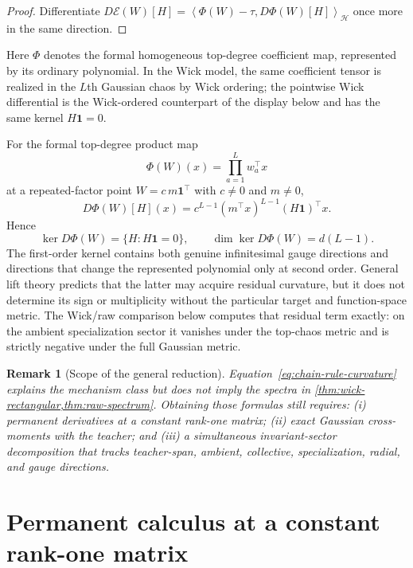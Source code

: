 \documentclass[11pt]{article}
\newtheorem{remark}[theorem]{Remark}
\newcommand{\one}{\mathbf{1}}
\newcommand{\ip}[2]{\left\langle #1,#2\right\rangle}
\begin{document}
\begin{proof}
Differentiate $D\mathcal E(W)[H]=\ip{\Phi(W)-\tau}{D\Phi(W)[H]}_{\mathcal H}$ once more in the same direction.
\end{proof}

Here $\Phi$ denotes the formal homogeneous top-degree coefficient map, represented by its ordinary polynomial.  In the Wick model, the same coefficient tensor is realized in the $L$th Gaussian chaos by Wick ordering; the pointwise Wick differential is the Wick-ordered counterpart of the display below and has the same kernel $H\one=0$.

For the formal top-degree product map
\[
\Phi(W)(x)=\prod_{a=1}^{L}w_a^\top x
\]
at a repeated-factor point $W=c\,m\one^\top$ with $c\ne0$ and $m\ne0$,
\begin{equation}
D\Phi(W)[H](x)
=c^{L-1}(m^\top x)^{L-1}(H\one)^\top x.
\label{eq:product-differential}
\end{equation}
Hence
\begin{equation}
\ker D\Phi(W)=\{H:H\one=0\},
\qquad
\dim\ker D\Phi(W)=d(L-1).
\label{eq:product-kernel}
\end{equation}
The first-order kernel contains both genuine infinitesimal gauge directions and directions that change the represented polynomial only at second order.  General lift theory predicts that the latter may acquire residual curvature, but it does not determine its sign or multiplicity without the particular target and function-space metric.  The Wick/raw comparison below computes that residual term exactly: on the ambient specialization sector it vanishes under the top-chaos metric and is strictly negative under the full Gaussian metric.

\begin{remark}[Scope of the general reduction]
Equation~\eqref{eq:chain-rule-curvature} explains the mechanism class but does not imply the spectra in \cref{thm:wick-rectangular,thm:raw-spectrum}.  Obtaining those formulas still requires: (i) permanent derivatives at a constant rank-one matrix; (ii) exact Gaussian cross-moments with the teacher; and (iii) a simultaneous invariant-sector decomposition that tracks teacher-span, ambient, collective, specialization, radial, and gauge directions.
\end{remark}

\section{Permanent calculus at a constant rank-one matrix}
\end{document}
